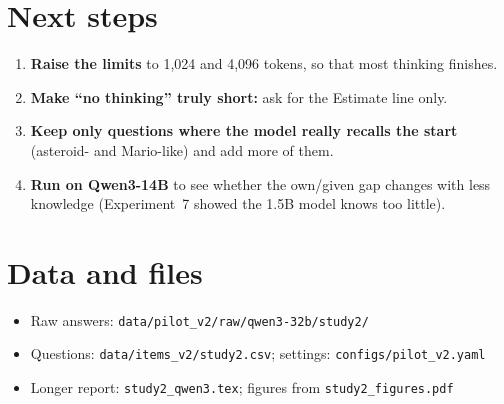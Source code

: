 \documentclass[11pt,a4paper]{article}
\begin{document}
\section{Next steps}
\begin{enumerate}[leftmargin=*]
  \item \textbf{Raise the limits} to 1,024 and 4,096 tokens, so that most thinking finishes.
  \item \textbf{Make \enquote{no thinking} truly short:} ask for the Estimate line only.
  \item \textbf{Keep only questions where the model really recalls the start} (asteroid- and Mario-like) and add more of them.
  \item \textbf{Run on Qwen3-14B} to see whether the own/given gap changes with less knowledge (Experiment~7 showed the 1.5B model knows too little).
\end{enumerate}

\appendix
\section{Data and files}
\begin{itemize}[leftmargin=*]
  \item Raw answers: \texttt{data/pilot\_v2/raw/qwen3-32b/study2/}
  \item Questions: \texttt{data/items\_v2/study2.csv}; settings: \texttt{configs/pilot\_v2.yaml}
  \item Longer report: \texttt{study2\_qwen3.tex}; figures from \texttt{study2\_figures.pdf}
\end{itemize}



\end{document}
